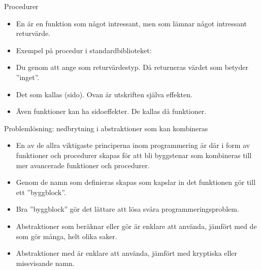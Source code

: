 \begin{Slide}{Procedurer}\SlideFontSmall
\begin{itemize}
\item En  är en funktion som  något intressant, men som  lämnar något intressant returvärde.
\item Exempel på procedur i standardbiblioteket: 
\item Du  genom att ange \texttt{} som returvärdestyp. Då returneras värdet \texttt{\Alert{()}} som betyder ''inget''.
\end{itemize}
\begin{itemize}
\item Det som  kallas (sido). Ovan är utskriften själva effekten.
\item Även funktioner kan ha sidoeffekter. De kallas då  funktioner.
\end{itemize}
\end{Slide}

\begin{Slide}{Problemlösning: nedbrytning i abstraktioner som kan kombineras}\SlideFontSmall
\begin{itemize}
\item En av de allra viktigaste principerna inom programmering är  där   i form av funktioner och procedurer skapas för att bli byggstenar som kombineras till mer avancerade funktioner och procedurer.

\item Genom de namn som definieras skapas  som kapslar in det funktionen gör till ett ''byggblock''.

\item Bra ''byggblock'' gör det lättare att lösa svåra programmeringsproblem.

\item Abstraktioner som beräknar eller gör  är enklare att använda, jämfört med de som gör många, helt olika saker.

\item Abstraktioner med  är enklare att använda, jämfört med kryptiska eller missvisande namn.
\end{itemize}

\end{Slide}

